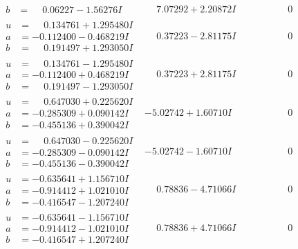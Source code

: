 \documentclass[1p]{elsarticle_modified}
\theoremstyle{definition}
\begin{document}
$$\begin{array}{c|c|c}
\begin{aligned}
b &= \phantom{-}0.06227 - 1.56276 I\end{aligned}
 & \phantom{-}7.07292 + 2.20872 I & \phantom{-0.000000 } 0 \\ \hline\begin{aligned}
u &= \phantom{-}0.134761 + 1.295480 I \\
a &= -0.112400 - 0.468219 I \\
b &= \phantom{-}0.191497 + 1.293050 I\end{aligned}
 & \phantom{-}0.37223 - 2.81175 I & \phantom{-0.000000 } 0 \\ \hline\begin{aligned}
u &= \phantom{-}0.134761 - 1.295480 I \\
a &= -0.112400 + 0.468219 I \\
b &= \phantom{-}0.191497 - 1.293050 I\end{aligned}
 & \phantom{-}0.37223 + 2.81175 I & \phantom{-0.000000 } 0 \\ \hline\begin{aligned}
u &= \phantom{-}0.647030 + 0.225620 I \\
a &= -0.285309 + 0.090142 I \\
b &= -0.455136 + 0.390042 I\end{aligned}
 & -5.02742 + 1.60710 I & \phantom{-0.000000 } 0 \\ \hline\begin{aligned}
u &= \phantom{-}0.647030 - 0.225620 I \\
a &= -0.285309 - 0.090142 I \\
b &= -0.455136 - 0.390042 I\end{aligned}
 & -5.02742 - 1.60710 I & \phantom{-0.000000 } 0 \\ \hline\begin{aligned}
u &= -0.635641 + 1.156710 I \\
a &= -0.914412 + 1.021010 I \\
b &= -0.416547 - 1.207240 I\end{aligned}
 & \phantom{-}0.78836 - 4.71066 I & \phantom{-0.000000 } 0 \\ \hline\begin{aligned}
u &= -0.635641 - 1.156710 I \\
a &= -0.914412 - 1.021010 I \\
b &= -0.416547 + 1.207240 I\end{aligned}
 & \phantom{-}0.78836 + 4.71066 I & \phantom{-0.000000 } 0 \\ \hline\begin{aligned}

\end{aligned}
\end{array}$$
\end{document}
